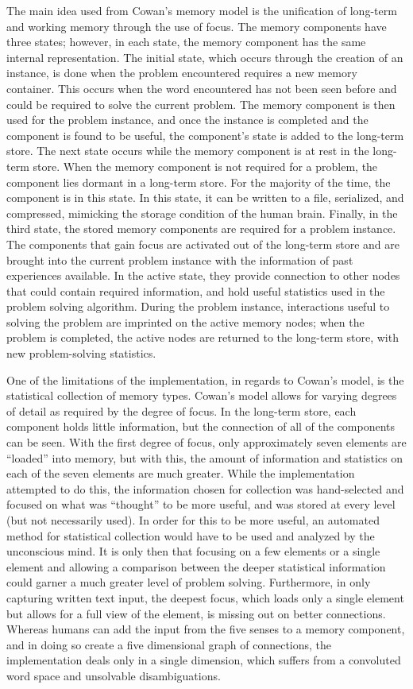 The main idea used from Cowan's memory model is the unification of long-term and
working memory through the use of focus.  The memory components have three
states; however, in each state, the memory component has the same internal
representation. The initial state, which occurs through the creation of an
instance, is done when the problem encountered requires a new memory container.
This occurs when the word encountered has not been seen before and could be
required to solve the current problem. The memory component is then used for the
problem instance, and once the instance is completed and the component is found
to be useful, the component's state is added to the long-term store. The next
state occurs while the memory component is at rest in the long-term store. When
the memory component is not required for a problem, the component lies dormant
in a long-term store. For the majority of the time, the component is in this
state.  In this state, it can be written to a file, serialized, and
compressed, mimicking the storage condition of the human brain. Finally, in the
third state, the stored memory components are required for a problem instance.
The components that gain focus are activated out of the long-term store and are
brought into the current problem instance with the information of past
experiences available. In the active state, they provide connection to other
nodes that could contain required information, and hold useful statistics used
in the problem solving algorithm.  During the problem instance, interactions
useful to solving the problem are imprinted on the active memory nodes; 
when the problem is completed, the active nodes are returned to the long-term
store, with new problem-solving statistics.

One of the limitations of the implementation, in regards to Cowan's model, is the
statistical collection of memory types.  Cowan's model allows for varying
degrees of detail as required by the degree of focus.  In the long-term store,
each component holds little information, but the connection of all of the
components can be seen.  With the first degree of focus, only approximately
seven elements are ``loaded'' into memory, but with this, the amount of
information and statistics on each of the seven elements are much greater.
While the implementation attempted to do this, the information chosen for
collection was hand-selected and focused on what was ``thought'' to be more
useful, and was stored at every level (but not necessarily used).  In order for
this to be more useful, an automated method for statistical collection would have
to be used and analyzed by the unconscious mind.  It is only then that focusing
on a few elements or a single element and allowing a comparison between the
deeper statistical information could garner a much greater level of problem
solving. Furthermore, in only capturing written text input, the deepest focus,
which loads only a single element but allows for a full view of the element, is
missing out on better connections.  Whereas humans can add the input from the
five senses to a memory component, and in doing so create a five dimensional
graph of connections, the implementation deals only in a single dimension, which
suffers from a convoluted word space and unsolvable disambiguations.

